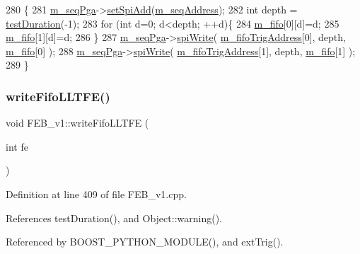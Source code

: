 \begin{DoxyCode}
280                          \{
281   \hyperlink{classFEB__v1_a6c7804ac86796f233a8393043adf2e77}{m\_seqPga}->\hyperlink{classSeqPGA_ac998ce3a6d9b5f2e88cc8393f8c1df53}{setSpiAdd}(\hyperlink{classFEB__v1_a1c1eb093fd1733b9510fcf8bc5c7ad08}{m\_seqAddress});
282   \textcolor{keywordtype}{int} depth = \hyperlink{classFEB__v1_a7f1db8ca9490172fce7603da9e703dec}{testDuration}(-1);
283   \textcolor{keywordflow}{for} (\textcolor{keywordtype}{int} d=0; d<depth; ++d)\{
284     \hyperlink{classFEB__v1_ae5b770f2f5ffb97324862c93e3153985}{m\_fifo}[0][d]=d;
285     \hyperlink{classFEB__v1_ae5b770f2f5ffb97324862c93e3153985}{m\_fifo}[1][d]=d;
286   \}
287   \hyperlink{classFEB__v1_a6c7804ac86796f233a8393043adf2e77}{m\_seqPga}->\hyperlink{classSeqPGA_ad4421841ce4ce8b88ad13f63216f0743}{spiWrite}( \hyperlink{classFEB__v1_ad41f8756c4e15815c6d5e35902cf2257}{m\_fifoTrigAddress}[0], depth, 
      \hyperlink{classFEB__v1_ae5b770f2f5ffb97324862c93e3153985}{m\_fifo}[0] );
288   \hyperlink{classFEB__v1_a6c7804ac86796f233a8393043adf2e77}{m\_seqPga}->\hyperlink{classSeqPGA_ad4421841ce4ce8b88ad13f63216f0743}{spiWrite}( \hyperlink{classFEB__v1_ad41f8756c4e15815c6d5e35902cf2257}{m\_fifoTrigAddress}[1], depth, 
      \hyperlink{classFEB__v1_ae5b770f2f5ffb97324862c93e3153985}{m\_fifo}[1] );
289 \}
\end{DoxyCode}
\mbox{\label{classFEB__v1_a9dbedaebc2e3569e8b5fc0be782dbce3}} 
\subsubsection{\texorpdfstring{write\+Fifo\+L\+L\+T\+F\+E()}{writeFifoLLTFE()}}
{\footnotesize\ttfamily void F\+E\+B\+\_\+v1\+::write\+Fifo\+L\+L\+T\+FE (\begin{DoxyParamCaption}\item[{int}]{fe }\end{DoxyParamCaption})}



Definition at line 409 of file F\+E\+B\+\_\+v1.\+cpp.



References test\+Duration(), and Object\+::warning().



Referenced by B\+O\+O\+S\+T\+\_\+\+P\+Y\+T\+H\+O\+N\+\_\+\+M\+O\+D\+U\+L\+E(), and ext\+Trig().


